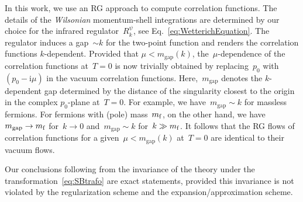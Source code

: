 \documentclass[prd,english,preprintnumbers,amsmath,amssymb,nofootinbib,twocolumn,superscriptaddress]{revtex4-1}
\newcommand{\I}{\mathrm{i}}
\begin{document}
{{In this work, we {use an RG approach} to compute correlation functions. The details of the {\it Wilsonian} momentum-shell integrations
are determined by our choice for the infrared regulator~$R^{\psi}_k$, see Eq.~\eqref{eq:WetterichEquation}. 
The regulator induces a gap~$\sim k$ for the two-point function and renders the correlation functions $k$-dependent. 
Provided that $\mu < m_{\text{gap}}(k)$, 
the~$\mu$-dependence of the correlation functions at~$T=0$ is now trivially obtained by replacing~$p_0$ 
with~$(p_0 - \I\mu)$ in the vacuum correlation functions.
Here,~$m_{\text{gap}}$ denotes the $k$-dependent gap determined by the distance of the 
singularity closest to the origin in the complex $p_0$-plane at~$T=0$. For example, we have~$m_{\text{gap}}\sim k$
for massless fermions. For fermions with (pole) 
mass~$m_{\rm f}$, on the other hand, we have~$m_{\text{gap}} \to m_{\rm f}$ for~$k\to 0$ and~$m_{\text{gap}}\sim k$
for~$k\gg m_{\rm f}$. It follows that the RG flows of  
correlation functions for a given~$\mu < m_{\text{gap}}(k)$ at~$T=0$ 
are identical to their vacuum flows.

Our conclusions following from the invariance of the theory under the transformation~\eqref{eq:SBtrafo} are exact statements,
provided this invariance is not violated  
by the regularization scheme and the
expansion/approximation scheme. 

}}
\end{document}

